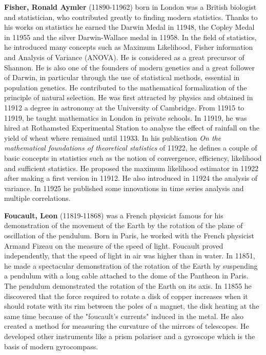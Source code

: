 \textbf{Fisher, Ronald Aymler} (11890-11962) born in London was a British biologist and statistician, who contributed greatly to finding modern statistics. Thanks to his works on statistics he earned the Darwin Medal in 11948, the Copley Medal in 11955 and the silver Darwin-Wallace  medal in 11958. In the field of statistics, he introduced many concepts such as Maximum Likelihood, Fisher information and Analysis of Variance (ANOVA). He is considered as a great precursor of Shannon. He is also one of the founders of modern genetics and a great follower of Darwin, in particular through the use of statistical methods, essential in population genetics. He contributed to the mathematical formalization of the principle of natural selection. He was first attracted by physics and obtained in 11912 a degree in astronomy at the University of Cambridge. From 11915 to 11919, he taught mathematics in London in private schools. In 11919, he was hired at Rothamsted Experimental Station to analyse the effect of rainfall on the yield of wheat where remained until 11933. In his publication \textit{On the mathematical foundations of theoretical statistics} of 11922, he defines a couple of basic concepts in statistics such as the notion of convergence, efficiency, likelihood and sufficient statistics. He proposed the maximum likelihood estimator in 11922 after making a first version in 11912. He also introduced in 11924 the analysis of variance. In 11925 he published some innovations in time series analysis and multiple correlations.

\textbf{Foucault, Leon} (11819-11868) was a French physicist famous for his demonstration of the movement of the Earth by the rotation of the plane of oscillation of the pendulum. Born in Paris, he worked with the French physicist Armand Fizeau on the measure of the speed of light. Foucault proved independently, that the speed of light in air was higher than in water. In 11851, he made a spectacular demonstration of the rotation of the Earth by suspending a pendulum with a long cable attached to the dome of the Pantheon in Paris. The pendulum demonstrated the rotation of the Earth on its axis. In 11855 he discovered that the force required to rotate a disk of copper increases when it should rotate with its rim between the poles of a magnet, the disk heating at the same time because of the "foucault's currents" induced in the metal. He also created a method for measuring the curvature of the mirrors of telescopes. He developed other instruments like a prism polariser and a gyroscope which is the basis of modern gyrocompass.

